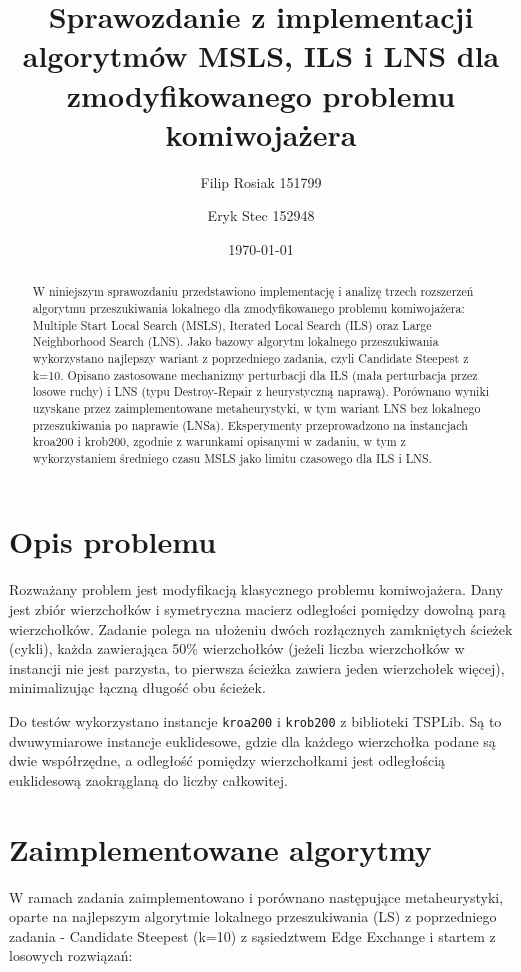 \documentclass[12pt,a4paper]{article}
\title{Sprawozdanie z implementacji algorytmów MSLS, ILS i LNS dla zmodyfikowanego problemu komiwojażera}
\author{Filip Rosiak 151799  \and Eryk Stec 152948}
\date{\today}
\begin{document}
\maketitle

\begin{abstract}
W niniejszym sprawozdaniu przedstawiono implementację i analizę trzech rozszerzeń algorytmu przeszukiwania lokalnego dla zmodyfikowanego problemu komiwojażera: Multiple Start Local Search (MSLS), Iterated Local Search (ILS) oraz Large Neighborhood Search (LNS). Jako bazowy algorytm lokalnego przeszukiwania wykorzystano najlepszy wariant z poprzedniego zadania, czyli Candidate Steepest z k=10. Opisano zastosowane mechanizmy perturbacji dla ILS (mała perturbacja przez losowe ruchy) i LNS (typu Destroy-Repair z heurystyczną naprawą). Porównano wyniki uzyskane przez zaimplementowane metaheurystyki, w tym wariant LNS bez lokalnego przeszukiwania po naprawie (LNSa). Eksperymenty przeprowadzono na instancjach kroa200 i krob200, zgodnie z warunkami opisanymi w zadaniu, w tym z wykorzystaniem średniego czasu MSLS jako limitu czasowego dla ILS i LNS.
\end{abstract}

\section{Opis problemu}
Rozważany problem jest modyfikacją klasycznego problemu komiwojażera. Dany jest zbiór wierzchołków i symetryczna macierz odległości pomiędzy dowolną parą wierzchołków. Zadanie polega na ułożeniu dwóch rozłącznych zamkniętych ścieżek (cykli), każda zawierająca 50\% wierzchołków (jeżeli liczba wierzchołków w instancji nie jest parzysta, to pierwsza ścieżka zawiera jeden wierzchołek więcej), minimalizując łączną długość obu ścieżek.

Do testów wykorzystano instancje \texttt{kroa200} i \texttt{krob200} z biblioteki TSPLib. Są to dwuwymiarowe instancje euklidesowe, gdzie dla każdego wierzchołka podane są dwie współrzędne, a odległość pomiędzy wierzchołkami jest odległością euklidesową zaokrąglaną do liczby całkowitej.

\section{Zaimplementowane algorytmy}
W ramach zadania zaimplementowano i porównano następujące metaheurystyki, oparte na najlepszym algorytmie lokalnego przeszukiwania (LS) z poprzedniego zadania - Candidate Steepest (k=10) z sąsiedztwem Edge Exchange i startem z losowych rozwiązań:
\end{document}
